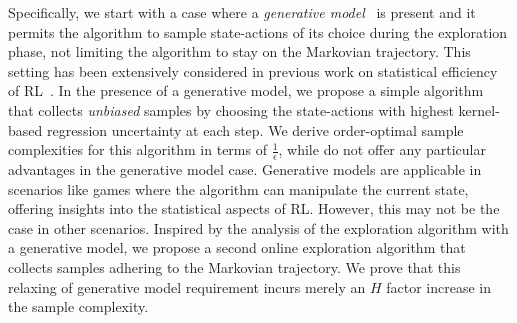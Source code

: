 Specifically, we start with a case where a \emph{generative model}~\citep{kakade2003sample} is present and it permits the algorithm to sample state-actions of its choice during the exploration phase, not limiting the algorithm to stay on the Markovian trajectory. This setting has been extensively considered in previous work on statistical efficiency of RL~\citep[see, e.g.,][]{kearns1998,gheshlaghi2013minimax, sidford2018near, sidford2018variance, agarwal2020model,yang2019sample}. In the presence of a generative model, we propose a simple algorithm that collects \emph{unbiased} samples by choosing the state-actions with highest kernel-based regression uncertainty at each step. 
We derive order-optimal sample complexities for this algorithm in terms of $\frac{1}{\epsilon}$, while \citet{vakilireward} do not offer any particular advantages in the generative model case. 
Generative models are applicable in scenarios like games where the algorithm can manipulate the current state, offering insights into the statistical aspects of RL.  However, this may not be the case in other scenarios. Inspired by the analysis of the exploration algorithm with a generative model, we propose a second online exploration algorithm that collects samples adhering to the Markovian trajectory. We prove that this relaxing of generative model requirement incurs merely an $H$ factor increase in the sample complexity.%

